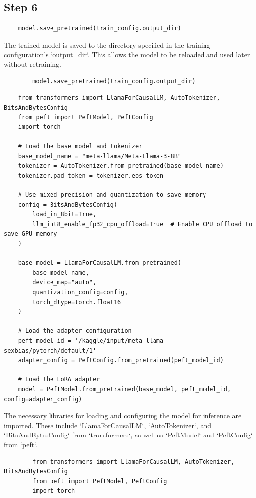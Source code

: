 \documentclass{solutionclass} %
\begin{document}
\subsection*{Step 6}



\begin{lstlisting}
	model.save_pretrained(train_config.output_dir)
\end{lstlisting}

\begin{solution}
	The trained model is saved to the directory specified in the training configuration's `output\_dir`. This allows the model to be reloaded and used later without retraining.
	\begin{lstlisting}
		model.save_pretrained(train_config.output_dir)
	\end{lstlisting}
\end{solution}

\begin{lstlisting}
	from transformers import LlamaForCausalLM, AutoTokenizer, BitsAndBytesConfig
	from peft import PeftModel, PeftConfig
	import torch
	
	# Load the base model and tokenizer
	base_model_name = "meta-llama/Meta-Llama-3-8B"
	tokenizer = AutoTokenizer.from_pretrained(base_model_name)
	tokenizer.pad_token = tokenizer.eos_token
	
	# Use mixed precision and quantization to save memory
	config = BitsAndBytesConfig(
		load_in_8bit=True,
		llm_int8_enable_fp32_cpu_offload=True  # Enable CPU offload to save GPU memory
	)
	
	base_model = LlamaForCausalLM.from_pretrained(
		base_model_name,
		device_map="auto",
		quantization_config=config,
		torch_dtype=torch.float16
	)
	
	# Load the adapter configuration
	peft_model_id = '/kaggle/input/meta-llama-sexbias/pytorch/default/1'
	adapter_config = PeftConfig.from_pretrained(peft_model_id)
	
	# Load the LoRA adapter
	model = PeftModel.from_pretrained(base_model, peft_model_id, config=adapter_config)
	\end{lstlisting}

\begin{solution}
	The necessary libraries for loading and configuring the model for inference are imported. These include `LlamaForCausalLM`, `AutoTokenizer`, and `BitsAndBytesConfig` from `transformers`, as well as `PeftModel` and `PeftConfig` from `peft`.
	\begin{lstlisting}
		from transformers import LlamaForCausalLM, AutoTokenizer, BitsAndBytesConfig
		from peft import PeftModel, PeftConfig
		import torch
	\end{lstlisting}
\end{solution}
\end{document}
